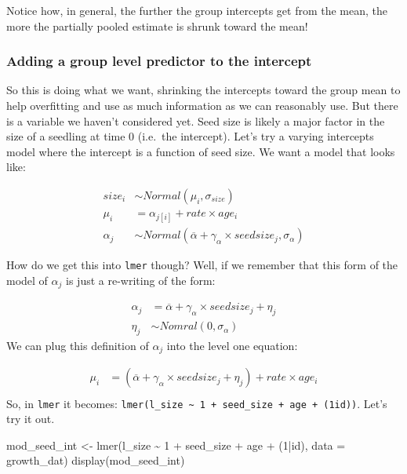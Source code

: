 \documentclass[
  letterpaper,
  DIV=11,
  numbers=noendperiod]{scrartcl}
\newenvironment{Shaded}{\begin{snugshade}}{\end{snugshade}}
\newcommand{\AttributeTok}[1]{\textcolor[rgb]{0.40,0.45,0.13}{#1}}
\newcommand{\DecValTok}[1]{\textcolor[rgb]{0.68,0.00,0.00}{#1}}
\newcommand{\FunctionTok}[1]{\textcolor[rgb]{0.28,0.35,0.67}{#1}}
\newcommand{\NormalTok}[1]{\textcolor[rgb]{0.00,0.23,0.31}{#1}}
\newcommand{\OtherTok}[1]{\textcolor[rgb]{0.00,0.23,0.31}{#1}}
\newcommand{\SpecialCharTok}[1]{\textcolor[rgb]{0.37,0.37,0.37}{#1}}
\begin{document}
Notice how, in general, the further the group intercepts get from the
mean, the more the partially pooled estimate is shrunk toward the mean!

\subsubsection{Adding a group level predictor to the
intercept}\label{adding-a-group-level-predictor-to-the-intercept}

So this is doing what we want, shrinking the intercepts toward the group
mean to help overfitting and use as much information as we can
reasonably use. But there is a variable we haven't considered yet. Seed
size is likely a major factor in the size of a seedling at time 0
(i.e.~the intercept). Let's try a varying intercepts model where the
intercept is a function of seed size. We want a model that looks like:

\[
\begin{align*}
size_{i} &\sim Normal(\mu_{i}, \sigma_{size})\\
\mu_i &= \alpha_{j[i]} + rate\times age_i\\
\alpha_{j} &\sim Normal(\overline{\alpha} + \gamma_{\alpha} \times seedsize_{j}, \sigma_{\alpha})
\end{align*}
\]

How do we get this into \texttt{lmer} though? Well, if we remember that
this form of the model of \(\alpha_j\) is just a re-writing of the form:

\[
\begin{align*}
\alpha_j &= \overline{\alpha} + \gamma_{\alpha} \times seedsize_j + \eta_j\\
\eta_j &\sim Nomral(0, \sigma_{\alpha})
\end{align*}
\] We can plug this definition of \(\alpha_j\) into the level one
equation:

\[
\begin{align*}
\mu_i &= (\overline{\alpha} + \gamma_{\alpha} \times seedsize_j + \eta_j) + rate\times age_i\\
\end{align*}
\] So, in \texttt{lmer} it becomes:
\texttt{lmer(l\_size\ \textasciitilde{}\ 1\ +\ seed\_size\ +\ age\ +\ (1\textbar{}id))}.
Let's try it out.

\begin{Shaded}
\begin{Highlighting}[]
\NormalTok{mod\_seed\_int }\OtherTok{\textless{}{-}} \FunctionTok{lmer}\NormalTok{(l\_size }\SpecialCharTok{\textasciitilde{}} \DecValTok{1} \SpecialCharTok{+}\NormalTok{ seed\_size }\SpecialCharTok{+}\NormalTok{ age }\SpecialCharTok{+}\NormalTok{ (}\DecValTok{1}\SpecialCharTok{|}\NormalTok{id), }\AttributeTok{data =}\NormalTok{ growth\_dat)}
\FunctionTok{display}\NormalTok{(mod\_seed\_int)}
\end{Highlighting}
\end{Shaded}
\end{document}
